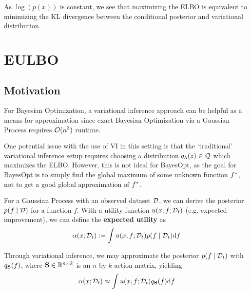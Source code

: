 \documentclass[11pt]{article}
\numberwithin{figure}{section}
\numberwithin{equation}{section}
\begin{document}
As $\log(p(x))$ is constant, we see that maximizing the ELBO is equivalent to minimizing the KL divergence between the conditional posterior and variational distribution. 

\section{EULBO}
\subsection{Motivation}
For Bayesian Optimization, a variational inference approach can be helpful as a means for approximation since exact Bayesian Optimization via a Gaussian Process requires $\mathcal{O}(n^3)$ runtime.

One potential issue with the use of VI in this setting is that the `traditional' variational inference setup requires choosing a distribution $q_{\lambda}(z) \in \mathcal{Q}$ which maximizes the ELBO. However, this is not ideal for BayesOpt, as the goal for BayesOpt is to simply find the global maximum of some unknown function $f^{*}$, not to get a good global approximation of $f^{*}$. 

For a Gaussian Process with an observed dataset $\mathcal{D}$, we can derive the posterior $p(f \mid \mathcal{D})$ for a function $f$. With a utility function $u(x, f; \mathcal{D}_{t})$ (e.g. expected improvement), we can define the \textbf{expected utility} as
\begin{equation}
    \alpha(x; \mathcal{D}_{t}) := \int u(x, f; \mathcal{D}_{t})p(f \mid \mathcal{D}_{t})\textrm{d}f
\end{equation}

Through variational inference, we may approximate the posterior $p(f \mid \mathcal{D}_{t})$ with $q_{\mathbf{S}}(f)$, where $\mathbf{S} \in \mathbb{R}^{n \times k}$ is an $n$-by-$k$ action matrix, yielding 
\begin{equation}
    \alpha(x; \mathcal{D}_{t}) \approx \int u(x, f; \mathcal{D}_{t})q_{\mathbf{S}}(f)\textrm{d}f 
\end{equation}

\newpage
\end{document}
